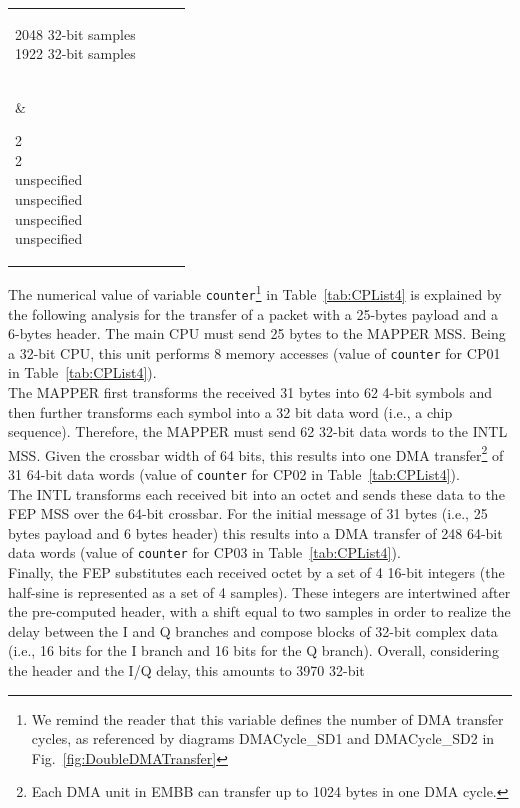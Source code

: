 \documentclass{llncs}
\begin{document}
\begin{table}[!htbp]
\begin{tabular}{| >{\centering\arraybackslash}p{2cm} | >{\centering\arraybackslash}p{4cm} | >{\centering\arraybackslash}p{4cm} |
>{\centering\arraybackslash}p{2cm} |}
		\parbox[t]{4cm}{2048 32-bit samples\\1922 32-bit samples\\ \\} &
		\parbox[t]{4cm}{2\\2\\unspecified\\unspecified\\unspecified\\unspecified\\} \\ \hline
\end{tabular}
\end{table}
%
The numerical value of variable \texttt{counter}\footnote{We remind the reader that this variable defines the number of
DMA transfer cycles, as referenced by diagrams DMACycle\_SD1 and DMACycle\_SD2 in Fig.~\ref{fig:DoubleDMATransfer}} in
Table~\ref{tab:CPList4} is explained by the following analysis for the transfer of a packet with a 25-bytes payload and
a 6-bytes header. The main CPU must send 25 bytes to the MAPPER MSS. Being a 32-bit CPU, this unit performs 8 memory
accesses (value of \texttt{counter} for CP01 in Table~\ref{tab:CPList4}).\\
%
The MAPPER first transforms the received 31 bytes into 62 4-bit symbols and then further transforms each symbol into a 32
bit data word (i.e., a chip sequence). Therefore, the MAPPER must send 62 32-bit data words to the INTL MSS. Given the
crossbar width of 64 bits, this results into one DMA transfer\footnote{Each DMA unit in EMBB can transfer up to 1024
bytes in one DMA cycle.} of 31 64-bit data words (value of \texttt{counter} for CP02 in Table~\ref{tab:CPList4}).\\
%
The INTL transforms each received bit into an octet and sends these data to the FEP MSS over the 64-bit crossbar. For
the initial message of 31 bytes (i.e., 25 bytes payload and 6 bytes header) this results into a DMA transfer of 248
64-bit data words (value of \texttt{counter} for CP03 in Table~\ref{tab:CPList4}).\\
%
Finally, the FEP substitutes each received octet by a set of 4 16-bit integers (the half-sine is represented as a set
of 4 samples). These integers are intertwined after the pre-computed header, with a shift equal to two samples in order
to realize the delay between the I and Q branches and compose blocks of 32-bit complex data (i.e., 16 bits for the I
branch and 16 bits for the Q branch). Overall, considering the header and the I/Q delay, this amounts to 3970 32-bit
\end{document}
